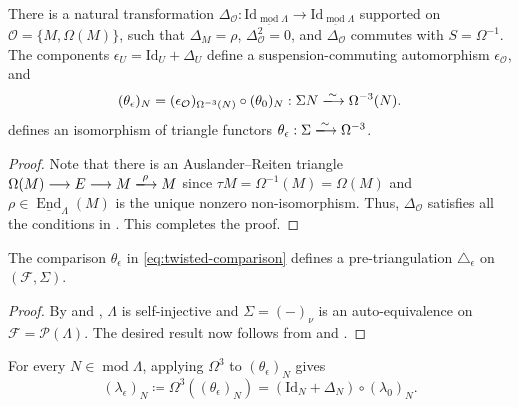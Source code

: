 \documentclass[a4paper,reqno,10pt]{amsart}
\numberwithin{equation}{section}
\DeclareMathOperator{\modu}{mod}
\DeclareMathOperator{\End}{End}
\newcommand{\cF}{\mathcal F}
\newcommand{\cO}{\mathcal O}
\newcommand{\Lam}{\Lambda}
\newcommand{\eps}{\epsilon}
\newcommand{\ol}[1]{\underline{#1}}
\begin{document}
\begin{proposition}\label{prop:twisted-comparison}
There is a natural transformation
$\Delta_{\cO}:\mathrm{Id}_{\ol{\modu}\Lam}
\longrightarrow\mathrm{Id}_{\ol{\modu}\Lam}$ supported on $\cO=\{M,\Omega(M)\}$, 
such that $\Delta_{M}=\rho$, $\Delta_{\cO}^2=0$, and
$\Delta_{\cO}$ commutes with $S=\Omega^{-1}$. The components
$\eps_{U}=\mathrm{Id}_U+\Delta_{U}$ define a
suspension-commuting automorphism $\eps_{\cO}$, and
\begin{equation}\label{eq:twisted-comparison}
 (\theta_\eps)_N
 =(\eps_{\cO})_{\Omega^{-3}(N)}\circ(\theta_0)_N:
 \Sigma N\xlongrightarrow{\sim}\Omega^{-3}(N).
\end{equation}
defines an isomorphism of triangle functors
$\theta_\eps:\Sigma\xlongrightarrow{\sim}\Omega^{-3}$.
\end{proposition}

\begin{proof}
Note that there is an Auslander--Reiten triangle $ \Omega(M) \longrightarrow E\longrightarrow M \xlongrightarrow{\rho} M$ since $\tau M=\Omega^{-1}(M)=\Omega(M)$ and $\rho\in \ol{\End}_{\Lambda}(M)$ is the unique nonzero non-isomorphism. Thus, $\Delta_\cO$ satisfies all the conditions in . This completes the proof. 
\end{proof}

\begin{corollary}\label{cor:pretriangulation}
The comparison $\theta_\eps$ in \eqref{eq:twisted-comparison} defines a pre-triangulation $\triangle_\eps$ on $(\cF,\Sigma)$.
\end{corollary}

\begin{proof}
By  and , $\Lam$ is self-injective and
$\Sigma=(-)_\nu$ is an auto-equivalence on $\cF=\mathcal P(\Lam)$. The desired result now follows from  and .
\end{proof}

\begin{lemma}\label{lem:twisted-lambda}
For every $N\in\modu\Lam$, applying $\Omega^3$ to
$(\theta_\eps)_N$ gives
\begin{equation}\label{eq:twisted-lambda}
 (\lambda_\eps)_N\coloneqq \Omega^3((\theta_\epsilon)_N)
 =(\mathrm{Id}_N+\Delta_{N})\circ(\lambda_0)_N.
\end{equation}
\end{lemma}
\end{document}
